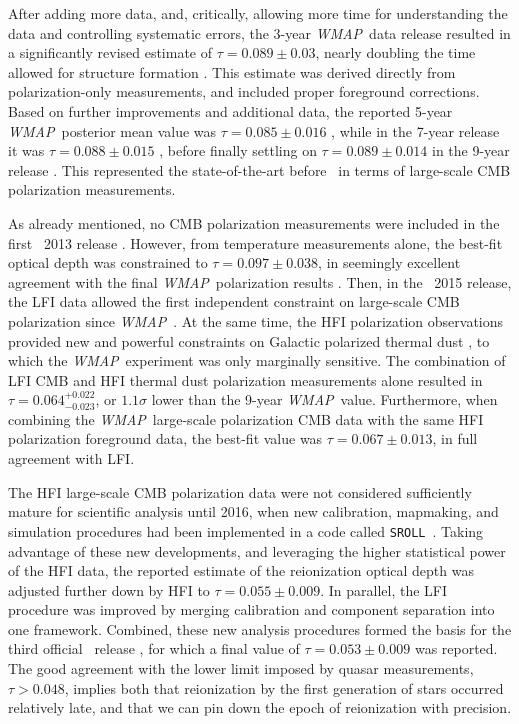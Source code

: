 \documentclass[twocolumn]{aa}
\def\WMAP{\emph{WMAP}}
\newcommand{\sroll}[0]{\texttt{SROLL}}
\begin{document}
After adding more data, and, critically, allowing more time for
understanding the data and controlling systematic errors, the 3-year
\WMAP\ data release resulted in a significantly revised estimate of
$\tau=0.089\pm0.03$, nearly doubling the time allowed for structure
formation \citep{page2007}. This estimate was derived directly from
polarization-only measurements, and included proper foreground
corrections. Based on further improvements and additional data, the
reported 5-year \WMAP\ posterior mean value was $\tau=0.085\pm0.016$
\citep{komatsu2009}, while in the 7-year release it was
$\tau=0.088\pm0.015$ \citep{larson2010}, before finally settling on
$\tau=0.089\pm0.014$ in the 9-year release \citep{hinshaw2012}. This
represented the state-of-the-art before \Planck\ in terms of
large-scale CMB polarization measurements.

As already mentioned, no CMB polarization measurements were included
in the first \Planck\ 2013 release \citep{planck2013-p01}. However,
from temperature measurements alone, the best-fit optical depth was
constrained to $\tau=0.097\pm0.038$, in seemingly excellent
agreement with the final \WMAP\ polarization results
\citep{planck2013-p11}. Then, in the \Planck\ 2015 release, the LFI
data allowed the first independent constraint on large-scale CMB
polarization since \WMAP\ \citep{planck2014-a13}. At the same time,
the HFI polarization observations provided new and powerful
constraints on Galactic polarized thermal dust \citep{planck2014-a12},
to which the \WMAP\ experiment was only marginally sensitive. The
combination of LFI CMB and HFI thermal dust polarization measurements
alone resulted in $\tau=0.064^{+0.022}_{-0.023}$, or $1.1\sigma$ lower
than the 9-year \WMAP\ value. Furthermore, when combining the
\WMAP\ large-scale polarization CMB data with the same HFI polarization
foreground data, the best-fit value was $\tau=0.067\pm0.013$, in full agreement
with LFI.

The HFI large-scale CMB polarization data were not considered
sufficiently mature for scientific analysis until 2016, when new
calibration, mapmaking, and simulation procedures had been implemented
in a code called \sroll\ \citep{Planck_PIP_XLVIII}. Taking advantage
of these new developments, and leveraging the higher statistical power
of the HFI data, the reported estimate of the reionization optical
depth was adjusted further down by HFI to $\tau=0.055\pm0.009$. In
parallel, the LFI procedure was improved by merging calibration and
component separation into one framework.  Combined, these new analysis
procedures formed the basis for the third official
\Planck\ release \citep{planck2016-l01}, for which a final value of
$\tau=0.053\pm0.009$ was reported. The good agreement with the lower
limit imposed by quasar measurements, $\tau > 0.048$, implies both
that reionization by the first generation of stars occurred relatively
late, and that we can pin down the epoch of reionization with
precision.
\end{document}
